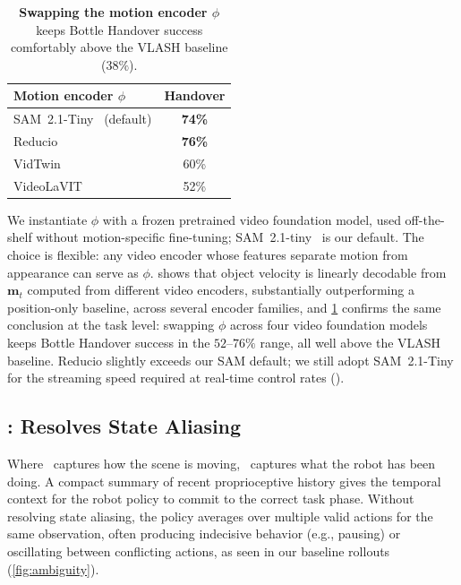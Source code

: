 \begin{table}
\centering
\vspace{-\baselineskip}
\small
\setlength{\tabcolsep}{4pt}
\begin{tabular}{lc}
\toprule
Motion encoder $\phi$ & Handover \\
\midrule
SAM~2.1-Tiny~\cite{sam2} (default) & \textbf{74\%} \\
Reducio~\cite{reducio}       & \textbf{76\%} \\
VidTwin~\cite{vidtwin}       & 60\% \\
VideoLaVIT~\cite{videolavit} & 52\% \\
\bottomrule
\end{tabular}
\caption{\textbf{Swapping the motion encoder $\phi$} keeps Bottle Handover success comfortably above the VLASH baseline ($38\%$).}
\label{tab:encoder_swap}
\end{table}
We instantiate $\phi$ with a frozen pretrained video foundation model, used off-the-shelf without motion-specific fine-tuning; SAM~2.1-tiny~\cite{sam2} is our default. The choice is flexible: any video encoder whose features separate motion from appearance can serve as $\phi$.  shows that object velocity is linearly decodable from $\mathbf{m}_t$ computed from different video encoders, substantially outperforming a position-only baseline, across several encoder families, and \cref{tab:encoder_swap} confirms the same conclusion at the task level: swapping $\phi$ across four video foundation models keeps Bottle Handover success in the $52$–$76\%$ range, all well above the VLASH baseline. Reducio slightly exceeds our SAM default; we still adopt SAM~2.1-Tiny for the streaming speed required at real-time control rates ().

\vspace{-0.3em}
\subsection{\TEMPOACT: Resolves State Aliasing}
Where \TEMPOMOT\ captures how the scene is moving, \TEMPOACT\ captures what the robot has been doing. A compact summary of recent proprioceptive history gives the temporal context for the robot policy to commit to the correct task phase. Without resolving state aliasing, the policy averages over multiple valid actions for the same observation, often producing indecisive behavior (e.g., pausing) or oscillating between conflicting actions, as seen in our baseline rollouts (\cref{fig:ambiguity}).

